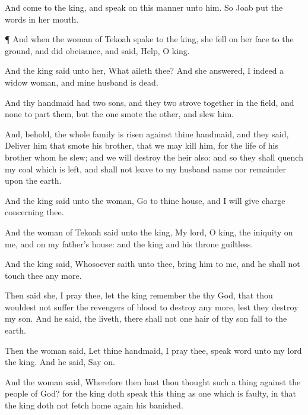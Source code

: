 {And
come to the
king, and
speak on this
manner unto him. So
Joab
put the
words in her
mouth.


\par }{\PP {}¶ And when the
woman of
Tekoah
spake to the
king, she
fell on her
face to the
ground, and did
obeisance, and
said,
Help, O
king.

And the
king
said unto her, What aileth thee? And she
answered, I
{}
indeed a
widow
woman, and mine
husband is
dead.

And thy
handmaid had
two
sons, and they
two strove
together in the
field, and
{} none to
part them, but the
one
smote the
other, and
slew him.

And, behold, the whole
family is
risen against thine
handmaid, and they
said,
Deliver him that
smote his
brother, that we may
kill him, for the
life of his
brother whom he
slew; and we will
destroy the
heir also: and so they shall
quench my
coal which is
left, and shall not
leave to my
husband
{}
name nor
remainder
upon the
earth.

And the
king
said unto the
woman,
Go to thine
house, and I will give
charge concerning thee.

And the
woman of
Tekoah
said unto the
king, My
lord, O
king, the
iniquity
{} on me, and on my
father’s
house: and the
king and his
throne
{}
guiltless.

And the
king
said, Whosoever
saith
{} unto thee,
bring him to me, and he shall not
touch thee any
more.

Then
said she, I pray thee, let the
king
remember the
{} thy
God, that thou wouldest not suffer the
revengers of
blood to
destroy any
more, lest they
destroy my
son. And he
said,
{} the
{}
liveth, there shall not one
hair of thy
son
fall to the
earth.

Then the
woman
said, Let thine
handmaid, I pray thee,
speak
{}
word unto my
lord the
king. And he
said, Say
on.

And the
woman
said, Wherefore then hast thou
thought such a thing against the
people of
God? for the
king doth
speak this
thing as one which is
faulty, in that the
king doth not fetch home
again his
banished.

}
